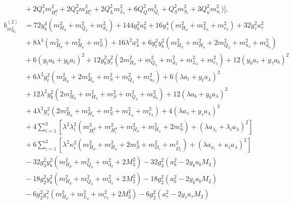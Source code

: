 \documentclass[preprint,amsmath,amssymb,aps,superscriptaddress,prd,
showpacs,floatfix,nofootinbib]{revtex4-1}
\begin{document}
\begin{subequations}
\begin{align}
& {} + 2 Q_1^2 m_{H_i^d}^2 + 2 Q_2^2 m_{H_i^u}^2 + 2 Q_L^2 m_{L_i}^2 +
6 Q_Q^2 m_{Q_i}^2 + Q_S^2 m_{S_i}^2 + 3 Q_u^2 m_{u_i}^2 \big ) \bigg ] ,
\label{eq:USSMmHd2BetaTwoLoop} \\
b_{m_{H_d}^2}^{(2)} &= 72 y_b^4 \left ( m_{H_d}^2 + m_{Q_3}^2 + m_{d_3}^2
\right ) + 144 y_b^2 a_b^2 + 16 y_\tau^4 \left ( m_{H_d}^2 + m_{L_3}^2 +
m_{e_3}^2 \right ) + 32 y_\tau^2 a_\tau^2 \nonumber \\
& {} + 8 \lambda^4 \left ( m_{H_d}^2 + m_{H_u}^2 + m_S^2 \right ) +
16 \lambda^2 a_\lambda^2 + 6 y_t^2 y_b^2 \left ( m_{H_d}^2 + m_{H_u}^2 +
2 m_{Q_3}^2 + m_{u_3}^2 + m_{d_3}^2 \right ) \nonumber \\
& {} + 6 \left ( y_t a_b + y_b a_t \right )^2 + 12 y_b^2 y_\tau^2
\left ( 2 m_{H_d}^2 + m_{Q_3}^2 + m_{d_3}^2 + m_{L_3}^2 + m_{e_3}^2 \right )
+ 12 \left ( y_b a_\tau + y_\tau a_b \right )^2 \nonumber \\
& {} + 6 \lambda^2 y_t^2 \left ( m_{H_d}^2 + 2 m_{H_u}^2 + m_S^2 + m_{Q_3}^2
+ m_{u_3}^2 \right ) + 6 \left ( \lambda a_t + y_t a_\lambda \right )^2
\nonumber \\
& {} + 12 \lambda^2 y_b^2 \left ( 2 m_{H_d}^2 + m_{H_u}^2 + m_S^2 +
m_{Q_3}^2 + m_{d_3}^2 \right ) + 12 \left ( \lambda a_b + y_b a_\lambda
\right )^2 \nonumber \\
& {} + 4 \lambda^2 y_\tau^2 \left ( 2 m_{H_d}^2 + m_{H_u}^2 + m_S^2 +
m_{L_3}^2 + m_{e_3}^2 \right ) + 4 \left ( \lambda a_\tau + y_\tau a_\lambda
\right )^2 \nonumber \\
& {} + 4 \sum_{i=1}^3 \left [ \lambda^2 \lambda_i^2 \left ( m_{H_i^d}^2 +
m_{H_i^u}^2 + m_{H_d}^2 + m_{H_u}^2 + 2 m_S^2 \right ) +
\left ( \lambda a_{\lambda_i} + \lambda_i a_\lambda \right )^2 \right ]
\nonumber \\
& {} + 6 \sum_{i=1}^3 \left [ \lambda^2 \kappa_i^2 \left ( m_{H_d}^2 +
m_{H_u}^2 + 2 m_S^2 + m_{D_i}^2 + m_{\overline{D}_i}^2 \right ) +
\left ( \lambda a_{\kappa_i} + \kappa_i a_\lambda \right )^2 \right ]
\nonumber \\
& {} - 32 g_3^2 y_b^2 \left ( m_{H_d}^2 + m_{Q_3}^2 + m_{d_3}^2 + 2 M_3^2
\right ) - 32 g_3^2 \left ( a_b^2 - 2 y_b a_b M_3 \right ) \nonumber \\
& {} - 18 g_2^2 y_b^2 \left ( m_{H_d}^2 + m_{Q_3}^2 + m_{d_3}^2 + 2 M_2^2
\right ) - 18 g_2^2 \left ( a_b^2 - 2 y_b a_b M_2 \right ) \nonumber \\
& {} - 6 g_2^2 y_\tau^2 \left ( m_{H_d}^2 + m_{L_3}^2 + m_{e_3}^2 + 2 M_2^2
\right ) - 6 g_2^2 \left ( a_\tau^2 - 2 y_\tau a_\tau M_2 \right ) \nonumber \\

\end{align}
\end{subequations}
\end{document}
